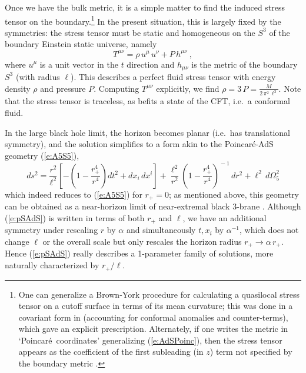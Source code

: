 \documentclass[12pt]{article}
\def\req#1{(\ref{#1})}
\def\Poinc{Poincar\' e}
\def\Rads{\ell}
\def\rh{r_+}
\begin{document}
Once we have the bulk metric, it is a simple matter  to find the induced stress tensor on the boundary.\footnote{
One can generalize a Brown-York procedure \cite{Brown:1992br} for 
calculating a quasilocal stress tensor on a cutoff surface in terms of its mean curvature; this was done in a covariant form  in \cite{Balasubramanian:1999re} (accounting for conformal anomalies and counter-terms), 
which gave an explicit prescription.  Alternately, if one writes the metric in `\Poinc\ coordinates' generalizing \req{e:AdSPoinc}, then the stress tensor appears as the coefficient of the first subleading  (in $z$) term not specified by the boundary metric \cite{Henningson:1998gx,deHaro:2000xn}.}
  In the present situation, this is largely fixed by the symmetries:  the stress tensor must be static and homogeneous on the $S^3$ of the boundary Einstein static universe, namely
%
\begin{equation}
T^{\mu\nu} = \rho \, u^\mu \, u^\nu + P \, h^{\mu\nu} \ ,
\label{e:sadsTab}
\end{equation}	
%
where $u^\mu$ is a unit vector in the $t$ direction and $h_{\mu\nu}$ is the metric of the boundary $S^3$ (with radius $\Rads$).
This describes a perfect fluid stress tensor with energy density $\rho$ and pressure $P$.  Computing $T^{\mu\nu}$ explicitly, we find 
$\rho = 3 \, P = \frac{M}{2 \, \pi^2 \, \Rads^3}$.  Note that the stress tensor is traceless, as befits a state of the CFT, i.e.\ a conformal fluid.  
 
In the large  black hole limit, the horizon becomes planar (i.e.\ has translational symmetry), and the solution simplifies to a form akin to  the \Poinc-AdS geometry \req{e:A5S5},
%
\begin{equation}
ds^2 =  \frac{r^2}{\Rads^2}\left[ - \left( 1- \frac{\rh^4}{r^4} \right) dt^2
+ dx_i \, dx^i \right] + \frac{\Rads^2}{r^2}  \left( 1- \frac{\rh^4}{r^4} \right)^{\! \! -1} \, dr^2 + \Rads^2 \, d\Omega_5^2
\label{e:pSAdS}
\end{equation}	
%
which indeed reduces to \req{e:A5S5} for $\rh= 0$; as mentioned above, this geometry can be obtained as a near-horizon limit of near-extremal black 3-brane \cite{Maldacena:1997re}.
Although \req{e:pSAdS} is written in terms of both $\rh$ and $\Rads$, we have an additional symmetry under rescaling $r$ by $\alpha$ and simultaneously $t,x_i$ by $\alpha^{-1}$, which does not change $\Rads$ or the overall scale but only rescales the horizon radius $\rh \to \alpha \, \rh$.  Hence  \req{e:pSAdS} really describes a 1-parameter family of solutions, more naturally characterized by $\rh / \Rads$.
\end{document}
